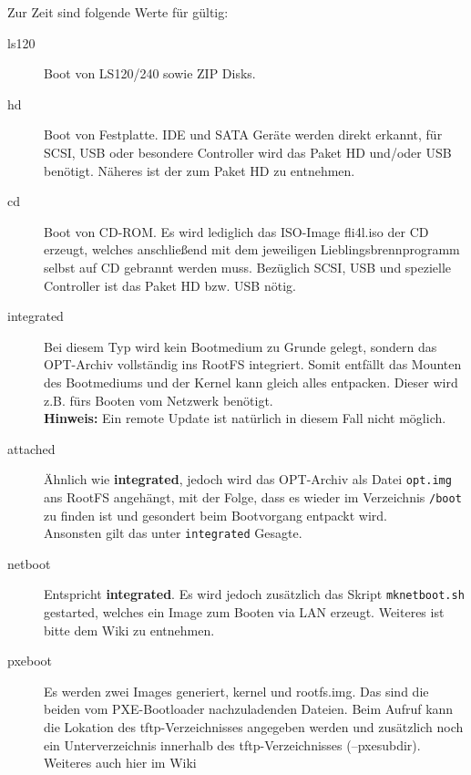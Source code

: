 \begin{description}
 Zur Zeit sind folgende Werte für  gültig:

  \begin{description}
  \item[ls120] Boot von LS120/240 sowie ZIP Disks.
  \item[hd] Boot von Festplatte. IDE und SATA Geräte werden direkt erkannt, für SCSI, USB oder besondere Controller
            wird das Paket HD und/oder USB benötigt.
            Näheres ist der  zum Paket HD zu entnehmen.
  \item[cd] Boot von CD-ROM.  Es wird lediglich das ISO-Image fli4l.iso der CD erzeugt, welches
            anschließend mit dem jeweiligen Lieblingsbrennprogramm selbst auf
            CD gebrannt werden muss. Bezüglich SCSI, USB und spezielle Controller ist das Paket HD bzw. USB nötig.
  \item[integrated] Bei diesem Typ wird kein Bootmedium zu Grunde gelegt,
                    sondern das OPT-Archiv vollständig ins RootFS
                    integriert. Somit entfällt das Mounten des Bootmediums
                    und der Kernel kann gleich alles entpacken. Dieser
                     wird z.B. fürs Booten vom Netzwerk
                    benötigt.\\
                    \textbf{Hinweis: } Ein remote Update ist natürlich in diesem
                    Fall nicht möglich.
  \item[attached] Ähnlich wie \textbf{integrated}, jedoch wird das
                  OPT-Archiv als Datei \texttt{opt.img} ans RootFS
                  angehängt, mit der Folge, dass es wieder im Verzeichnis
                  \texttt{/boot} zu finden ist und gesondert beim Bootvorgang
                  entpackt wird.\\
                  Ansonsten gilt das unter \texttt{integrated} Gesagte.
  \item[netboot] Entspricht \textbf{integrated}. Es wird jedoch zusätzlich das
                 Skript \texttt{mknetboot.sh} gestarted, welches ein Image zum
                 Booten via LAN erzeugt. Weiteres ist bitte dem Wiki 
                 zu entnehmen.
  \item[pxeboot] Es werden zwei Images generiert, kernel und rootfs.img. Das sind die beiden vom
		 PXE-Bootloader nachzuladenden Dateien. Beim Aufruf kann
		 die Lokation des tftp-Verzeichnisses angegeben werden und zusätzlich noch ein
		 Unterverzeichnis innerhalb des tftp-Verzeichnisses (--pxesubdir).
		 Weiteres auch hier im Wiki            
  \end{description}


\end{description}
